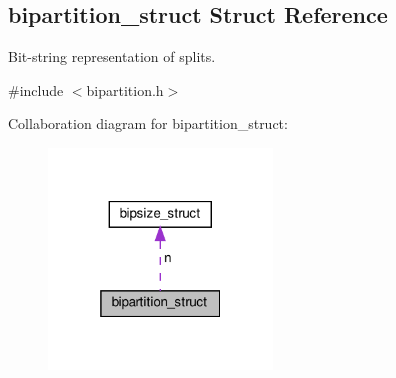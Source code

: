 \hypertarget{structbipartition__struct}{}\subsection{bipartition\+\_\+struct Struct Reference}
\label{structbipartition__struct}


Bit-\/string representation of splits.  




{\ttfamily \#include $<$bipartition.\+h$>$}



Collaboration diagram for bipartition\+\_\+struct\+:\nopagebreak
\begin{figure}[H]
\begin{center}
\leavevmode
\includegraphics[width=169pt]{structbipartition__struct__coll__graph}
\end{center}
\end{figure}
